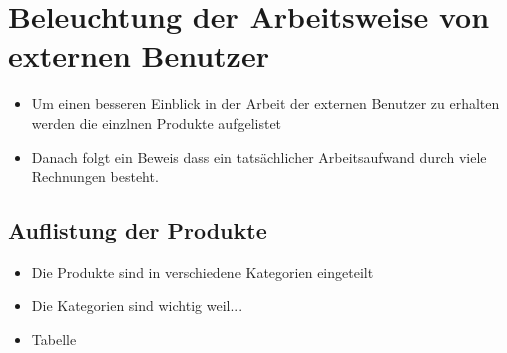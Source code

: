 \chapter{Beleuchtung der Arbeitsweise von externen Benutzer}

\begin{itemize}
	\item Um einen besseren Einblick in der Arbeit der externen Benutzer zu erhalten werden die einzlnen Produkte aufgelistet
	\item Danach folgt ein Beweis dass ein tatsächlicher Arbeitsaufwand durch viele Rechnungen besteht.
\end{itemize}

\section{Auflistung der Produkte}
\begin{itemize}
	\item Die Produkte sind in verschiedene Kategorien eingeteilt
	\item Die Kategorien sind wichtig weil...
	\item Tabelle
\end{itemize}

